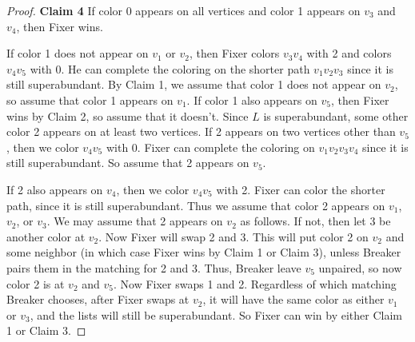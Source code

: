 \documentclass[12pt,reqno]{amsart}
\theoremstyle{plain}
\theoremstyle{definition}
\theoremstyle{remark}
\begin{document}
\begin{proof}
\noindent
\textbf{Claim 4}
If color 0 appears on all vertices and color 1 appears on $v_3$ and $v_4$, then
Fixer wins. 

If color 1 does not appear on $v_1$ or $v_2$, then Fixer colors
$v_3v_4$ with 2 and colors $v_4v_5$ with 0.  He can complete the coloring on
the shorter path $v_1v_2v_3$ since it is still superabundant.  By Claim 1, we
assume that color 1 does not appear on $v_2$, so assume that color 1 appears on
$v_1$.  If color 1 also appears on $v_5$, then Fixer wins by Claim 2, so assume
that it doesn't.  Since $L$ is superabundant, some other color 2 appears on at
least two vertices.  If 2 appears on two vertices other than $v_5$, then we
color $v_4v_5$ with 0.  Fixer can complete the coloring on $v_1v_2v_3v_4$ since
it is still superabundant.  So assume that 2 appears on $v_5$.  

If 2 also
appears on $v_4$, then we color $v_4v_5$ with 2. Fixer can color the shorter
path, since it is still superabundant.  Thus we assume that color 2 appears on
$v_1$, $v_2$, or $v_3$.
We may assume that 2 appears on $v_2$ as follows.  If not, then let 3 be
another color at $v_2$.  Now Fixer will swap 2 and 3.  This will put color 2 on
$v_2$ and some neighbor (in which case Fixer wins by Claim 1 or Claim 3),
unless Breaker pairs them in the matching for 2 and 3.  Thus, Breaker leave
$v_5$ unpaired, so now color 2 is at $v_2$ and $v_5$.
%
Now Fixer swaps 1 and 2.
Regardless of which matching Breaker chooses, after Fixer swaps at $v_2$, it
will have the same color as either $v_1$ or $v_3$, and the lists will still be
superabundant.  So Fixer can win by either Claim 1 or Claim 3.  
\smallskip

%
%
%


\end{proof}
\end{document}

